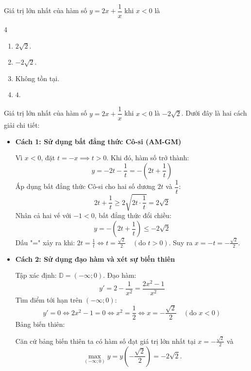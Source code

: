 \begin{baitap}
	Giá trị lớn nhất của hàm số $y = 2x + \dfrac{1}{x}$ khi $x < 0$ là
	\begin{multicols}{4}
		\begin{enumerate}
			\item $2\sqrt{2}$.
			\item $-2\sqrt{2}$.
			\item Không tồn tại.
			\item $4$.
		\end{enumerate}
	\end{multicols}
	\begin{traloi}
		 Giá trị lớn nhất của hàm số $y = 2x + \dfrac{1}{x}$ khi $x < 0$ là $-2\sqrt{2}$. Dưới đây là hai cách giải chi tiết:
		\begin{itemize}
			\item \textbf{Cách 1: Sử dụng bất đẳng thức Cô-si (AM-GM)}
			
			Vì $x < 0$, đặt $t = -x \implies t > 0$. Khi đó, hàm số trở thành:$$y = -2t - \dfrac{1}{t} = -\left(2t + \dfrac{1}{t}\right)$$Áp dụng bất đẳng thức Cô-si cho hai số dương $2t$ và $\dfrac{1}{t}$:$$2t + \dfrac{1}{t} \ge 2\sqrt{2t \cdot \dfrac{1}{t}} = 2\sqrt{2}$$Nhân cả hai vế với $-1 < 0$, bất đẳng thức đổi chiều:$$y = -\left(2t + \dfrac{1}{t}\right) \le -2\sqrt{2}$$
			Dấu "=" xảy ra khi: $2t = \frac{1}{t} \Leftrightarrow t=\frac{\sqrt{2}}{2} \quad (\text{do } t > 0)$. Suy ra $x = -t = -\frac{\sqrt{2}}{2}$.
			\item \textbf{Cách 2: Sử dụng đạo hàm và xét sự biến thiên}
			
			Tập xác định: $\mathbb{D} = (-\infty; 0)$. Đạo hàm: $$y' = 2 - \dfrac{1}{x^2} = \dfrac{2x^2 - 1}{x^2}$$
			Tìm điểm tới hạn trên $(-\infty; 0)$: $$y' = 0 \iff 2x^2 - 1 = 0 \iff x^2 = \dfrac{1}{2} \iff x = -\dfrac{\sqrt{2}}{2} \quad (\text{do } x < 0)$$
			Bảng biến thiên:
			\begin{center}
			\end{center}
			Căn cứ bảng biến thiên ta có hàm số đạt giá trị lớn nhất tại $ x=-\frac{\sqrt{2}}{2} $ và $$\max\limits_{(-\infty; 0)} y = y\left(-\frac{\sqrt{2}}{2}\right) = -2\sqrt{2}.$$
		\end{itemize}
	\end{traloi}
\end{baitap}
